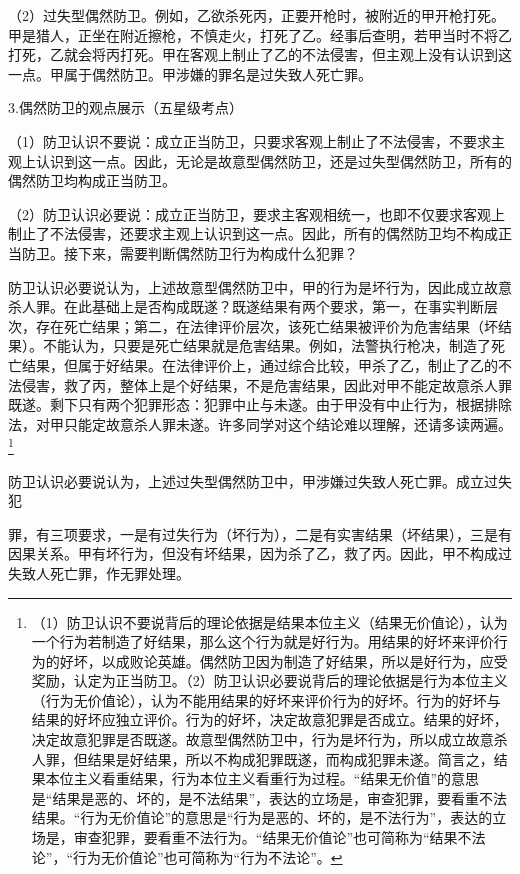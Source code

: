 （2）过失型偶然防卫。例如，乙欲杀死丙，正要开枪时，被附近的甲开枪打死。甲是猎人，正坐在附近擦枪，不慎走火，打死了乙。经事后查明，若甲当时不将乙打死，乙就会将丙打死。甲在客观上制止了乙的不法侵害，但主观上没有认识到这一点。甲属于偶然防卫。甲涉嫌的罪名是过失致人死亡罪。

3.偶然防卫的观点展示（五星级考点）

（1）防卫认识不要说：成立正当防卫，只要求客观上制止了不法侵害，不要求主观上认识到这一点。因此，无论是故意型偶然防卫，还是过失型偶然防卫，所有的偶然防卫均构成正当防卫。

（2）防卫认识必要说：成立正当防卫，要求主客观相统一，也即不仅要求客观上制止了不法侵害，还要求主观上认识到这一点。因此，所有的偶然防卫均不构成正当防卫。接下来，需要判断偶然防卫行为构成什么犯罪？

防卫认识必要说认为，上述故意型偶然防卫中，甲的行为是坏行为，因此成立故意杀人罪。在此基础上是否构成既遂？既遂结果有两个要求，第一，在事实判断层次，存在死亡结果；第二，在法律评价层次，该死亡结果被评价为危害结果（坏结果）。不能认为，只要是死亡结果就是危害结果。例如，法警执行枪决，制造了死亡结果，但属于好结果。在法律评价上，通过综合比较，甲杀了乙，制止了乙的不法侵害，救了丙，整体上是个好结果，不是危害结果，因此对甲不能定故意杀人罪既遂。剩下只有两个犯罪形态：犯罪中止与未遂。由于甲没有中止行为，根据排除法，对甲只能定故意杀人罪未遂。许多同学对这个结论难以理解，还请多读两遍。\footnote{（1）防卫认识不要说背后的理论依据是结果本位主义（结果无价值论），认为一个行为若制造了好结果，那么这个行为就是好行为。用结果的好坏来评价行为的好坏，以成败论英雄。偶然防卫因为制造了好结果，所以是好行为，应受奖励，认定为正当防卫。（2）防卫认识必要说背后的理论依据是行为本位主义（行为无价值论），认为不能用结果的好坏来评价行为的好坏。行为的好坏与结果的好坏应独立评价。行为的好坏，决定故意犯罪是否成立。结果的好坏，决定故意犯罪是否既遂。故意型偶然防卫中，行为是坏行为，所以成立故意杀人罪，但结果是好结果，所以不构成犯罪既遂，而构成犯罪未遂。简言之，结果本位主义看重结果，行为本位主义看重行为过程。“结果无价值”的意思是“结果是恶的、坏的，是不法结果”，表达的立场是，审查犯罪，要看重不法结果。“行为无价值论”的意思是“行为是恶的、坏的，是不法行为”，表达的立场是，审查犯罪，要看重不法行为。“结果无价值论”也可简称为“结果不法论”，“行为无价值论”也可简称为“行为不法论”。}

防卫认识必要说认为，上述过失型偶然防卫中，甲涉嫌过失致人死亡罪。成立过失犯

罪，有三项要求，一是有过失行为（坏行为），二是有实害结果（坏结果），三是有因果关系。甲有坏行为，但没有坏结果，因为杀了乙，救了丙。因此，甲不构成过失致人死亡罪，作无罪处理。

